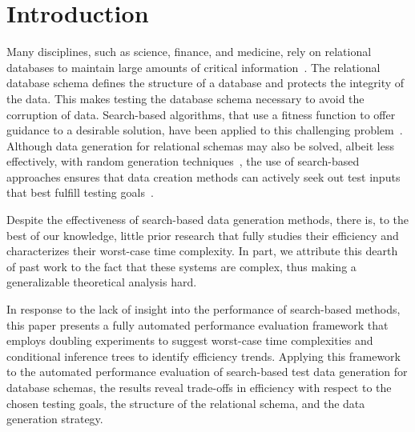 
\vspace*{-.15in}
\section{Introduction}
\vspace*{-.05in}



Many disciplines, such as science, finance, and medicine, rely on relational databases to maintain large amounts of
critical information~\cite{kapfhammer2007}. The relational database schema defines the structure of a database and
protects the integrity of the data. This makes testing the database schema necessary to avoid the corruption of data.
Search-based algorithms, that use a fitness function to offer guidance to a desirable solution, have been applied to
this challenging problem~\cite{kapfhammer2013}. Although data generation for relational schemas may also be solved,
albeit less effectively, with random generation techniques~\cite{mcminn2015}, the use of search-based approaches ensures
that data creation methods can actively seek out test inputs that best fulfill testing goals~\cite{mcminn2004a}.



Despite the effectiveness of search-based data generation methods, there is, to the best of our knowledge, little prior
research that fully studies their efficiency and characterizes their worst-case time complexity. In part, we attribute
this dearth of past work to the fact that these systems are complex, thus making a generalizable theoretical analysis
hard.

In response to the lack of insight into the performance of search-based methods, this paper presents a fully automated
performance evaluation framework that employs doubling experiments to suggest worst-case time complexities and
conditional inference trees to identify efficiency trends. Applying this framework to the automated performance
evaluation of search-based test data generation for database schemas, the results reveal trade-offs in efficiency with
respect to the chosen testing goals, the structure of the relational schema, and the data generation strategy.

